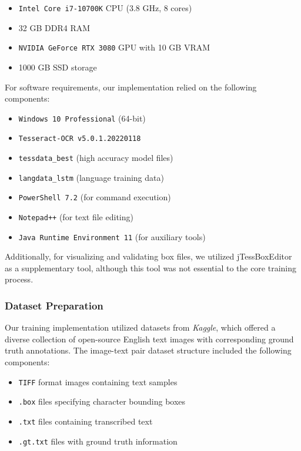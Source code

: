 \begin{itemize}
    \item \texttt{Intel Core i7-10700K} CPU (3.8 GHz, 8 cores)
    \item 32 GB DDR4 RAM
    \item \texttt{NVIDIA GeForce RTX 3080} GPU with 10 GB VRAM
    \item 1000 GB SSD storage
\end{itemize}

For software requirements, our implementation relied on the following components:

\begin{itemize}
    \item \texttt{Windows 10 Professional} (64-bit)
    \item \texttt{Tesseract-OCR v5.0.1.20220118}
    \item \texttt{tessdata\_best} (high accuracy model files)
    \item \texttt{langdata\_lstm} (language training data)
    \item \texttt{PowerShell 7.2} (for command execution)
    \item \texttt{Notepad++} (for text file editing)
    \item \texttt{Java Runtime Environment 11} (for auxiliary tools)
\end{itemize}
Additionally, for visualizing and validating box files, we utilized jTessBoxEditor as a supplementary tool, although this tool was not essential to the core training process.

\subsubsection{Dataset Preparation}
Our training implementation utilized datasets from \textit{Kaggle}, which offered a diverse collection of open-source English text images with corresponding ground truth annotations. The image-text pair dataset structure included the following components:

\begin{itemize}
    \item \texttt{TIFF} format images containing text samples
    \item \texttt{.box} files specifying character bounding boxes
    \item \texttt{.txt} files containing transcribed text
    \item \texttt{.gt.txt} files with ground truth information
\end{itemize}

